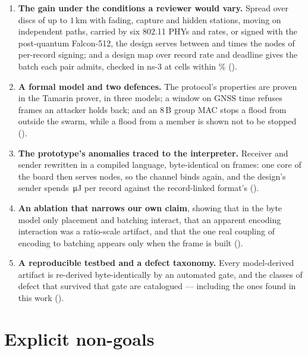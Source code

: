 \begin{enumerate}
\item \textbf{The gain under the conditions a reviewer would vary.} Spread over discs of up to
      $1$\,km with fading, capture and hidden stations, moving on independent paths, carried by
      six 802.11 PHYs and rates, or signed with the post-quantum Falcon-512, the design serves
      between \phySimRatioLo{} and \phySimRatioHi{} times the nodes of per-record signing; and a
      design map over record rate and deadline gives the batch each pair admits, checked in ns-3
      at \dmCells{} cells within \dmWorst\% ().

\item \textbf{A formal model and two defences.} The protocol's properties are proven in the
      Tamarin prover, in three models; a window on GNSS time refuses frames an attacker holds
      back; and an $8$\,B group MAC stops a flood from outside the swarm, while a flood from a
      member is shown not to be stopped ().

\item \textbf{The prototype's anomalies traced to the interpreter.} Receiver and sender
      rewritten in a compiled language, byte-identical on \rustIdFrames{} frames: one core of the
      board then serves \rxRustNodes{} nodes, so the channel binds again, and the design's
      sender spends \enRustMeas\,\si{\micro\joule} per record against the record-linked format's
      \enDesignMeas{} ().

\item \textbf{An ablation that narrows our own claim}, showing that in the byte model only
      placement and batching interact, that an apparent encoding interaction was a ratio-scale
      artifact, and that the one real coupling of encoding to batching appears only when the frame
      is built ().

\item \textbf{A reproducible testbed and a defect taxonomy.} Every model-derived artifact is
      re-derived byte-identically by an automated gate, and the classes of defect that survived
      that gate are catalogued --- including the ones found in this work
      ().
\end{enumerate}

\section{Explicit non-goals}

